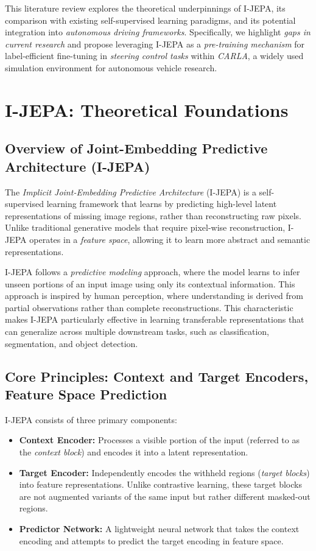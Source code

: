 \documentclass{article}
\begin{document}
This literature review explores the theoretical underpinnings of I-JEPA, its comparison with existing self-supervised learning paradigms, and its potential integration into \textit{autonomous driving frameworks}. Specifically, we highlight \textit{gaps in current research} and propose leveraging I-JEPA as a \textit{pre-training mechanism} for label-efficient fine-tuning in \textit{steering control tasks} within \textit{CARLA}, a widely used simulation environment for autonomous vehicle research.
\section{I-JEPA: Theoretical Foundations}

\subsection{Overview of Joint-Embedding Predictive Architecture (I-JEPA)}
The \textit{Implicit Joint-Embedding Predictive Architecture} (I-JEPA) \citep{jean2023ijepa} is a self-supervised learning framework that learns by predicting high-level latent representations of missing image regions, rather than reconstructing raw pixels. Unlike traditional generative models that require pixel-wise reconstruction, I-JEPA operates in a \textit{feature space}, allowing it to learn more abstract and semantic representations. 

I-JEPA follows a \textit{predictive modeling} approach, where the model learns to infer unseen portions of an input image using only its contextual information. This approach is inspired by human perception, where understanding is derived from partial observations rather than complete reconstructions. This characteristic makes I-JEPA particularly effective in learning transferable representations that can generalize across multiple downstream tasks, such as classification, segmentation, and object detection.

\subsection{Core Principles: Context and Target Encoders, Feature Space Prediction}
I-JEPA consists of three primary components:
\begin{itemize}
    \item \textbf{Context Encoder:} Processes a visible portion of the input (referred to as the \textit{context block}) and encodes it into a latent representation.
    \item \textbf{Target Encoder:} Independently encodes the withheld regions (\textit{target blocks}) into feature representations. Unlike contrastive learning, these target blocks are not augmented variants of the same input but rather different masked-out regions.
    \item \textbf{Predictor Network:} A lightweight neural network that takes the context encoding and attempts to predict the target encoding in feature space.
\end{itemize}
\end{document}
